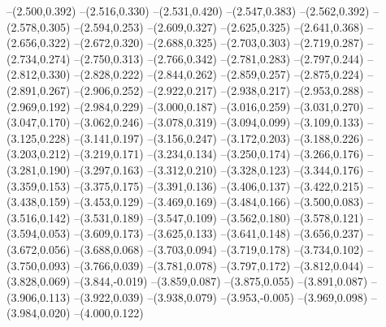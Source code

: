 {--(2.500,0.392)
--(2.516,0.330)
--(2.531,0.420)
--(2.547,0.383)
--(2.562,0.392)
--(2.578,0.305)
--(2.594,0.253)
--(2.609,0.327)
--(2.625,0.325)
--(2.641,0.368)
--(2.656,0.322)
--(2.672,0.320)
--(2.688,0.325)
--(2.703,0.303)
--(2.719,0.287)
--(2.734,0.274)
--(2.750,0.313)
--(2.766,0.342)
--(2.781,0.283)
--(2.797,0.244)
--(2.812,0.330)
--(2.828,0.222)
--(2.844,0.262)
--(2.859,0.257)
--(2.875,0.224)
--(2.891,0.267)
--(2.906,0.252)
--(2.922,0.217)
--(2.938,0.217)
--(2.953,0.288)
--(2.969,0.192)
--(2.984,0.229)
--(3.000,0.187)
--(3.016,0.259)
--(3.031,0.270)
--(3.047,0.170)
--(3.062,0.246)
--(3.078,0.319)
--(3.094,0.099)
--(3.109,0.133)
--(3.125,0.228)
--(3.141,0.197)
--(3.156,0.247)
--(3.172,0.203)
--(3.188,0.226)
--(3.203,0.212)
--(3.219,0.171)
--(3.234,0.134)
--(3.250,0.174)
--(3.266,0.176)
--(3.281,0.190)
--(3.297,0.163)
--(3.312,0.210)
--(3.328,0.123)
--(3.344,0.176)
--(3.359,0.153)
--(3.375,0.175)
--(3.391,0.136)
--(3.406,0.137)
--(3.422,0.215)
--(3.438,0.159)
--(3.453,0.129)
--(3.469,0.169)
--(3.484,0.166)
--(3.500,0.083)
--(3.516,0.142)
--(3.531,0.189)
--(3.547,0.109)
--(3.562,0.180)
--(3.578,0.121)
--(3.594,0.053)
--(3.609,0.173)
--(3.625,0.133)
--(3.641,0.148)
--(3.656,0.237)
--(3.672,0.056)
--(3.688,0.068)
--(3.703,0.094)
--(3.719,0.178)
--(3.734,0.102)
--(3.750,0.093)
--(3.766,0.039)
--(3.781,0.078)
--(3.797,0.172)
--(3.812,0.044)
--(3.828,0.069)
--(3.844,-0.019)
--(3.859,0.087)
--(3.875,0.055)
--(3.891,0.087)
--(3.906,0.113)
--(3.922,0.039)
--(3.938,0.079)
--(3.953,-0.005)
--(3.969,0.098)
--(3.984,0.020)
--(4.000,0.122)
}
